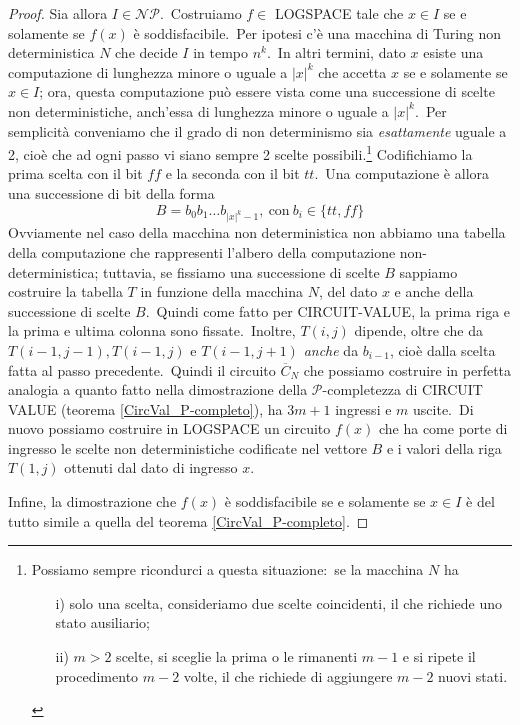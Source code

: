 \begin{proof}
    Sia allora $I \in \mathcal{NP}$.\
    Costruiamo $f \in$ LOGSPACE tale che $x \in I$ se e solamente se $f(x)$ è soddisfacibile.\
    Per ipotesi c'è una macchina di Turing non deterministica $N$ che decide $I$ in tempo $n^k$.\
    In altri termini, dato $x$ esiste una computazione di lunghezza minore o uguale a $|x|^k$ che accetta $x$ se e solamente se $x \in I$; ora, questa computazione può essere vista come una successione di scelte non deterministiche, anch'essa di lunghezza minore o uguale a $|x|^k$.\
    Per semplicità conveniamo che il grado di non determinismo sia \textit{esattamente} uguale a 2, cioè che ad ogni passo vi siano sempre 2 scelte possibili.\footnote{Possiamo sempre ricondurci a questa situazione:\ se la macchina $N$ ha
        \begin{itemize}
            \item[i)] solo una scelta, consideriamo due scelte coincidenti, il che richiede uno stato ausiliario;
            \item[ii)] $m > 2$ scelte, si sceglie la prima o le rimanenti $m-1$ e si ripete il procedimento $m-2$ volte, il che richiede di aggiungere $m-2$ nuovi stati.
        \end{itemize}}
    Codifichiamo la prima scelta con il bit $\mathit{ff}$ e la seconda con il bit $\mathit{tt}$.\
    Una computazione è allora una successione di bit della forma
    \[B = b_0 b_1 \dots b_{|x|^k-1},\ \mathrm{con}\ b_i \in \{\mathit{tt},\mathit{ff}\}\]
    Ovviamente nel caso della macchina non deterministica non abbiamo una tabella della computazione che rappresenti l'albero della computazione non-deterministica; tuttavia, se fissiamo una successione di scelte $B$ sappiamo costruire la tabella $T$ in funzione della macchina $N$, del dato $x$ e anche della successione di scelte $B$.\
    Quindi come fatto per {\footnotesize CIRCUIT-VALUE}, la prima riga e la prima e ultima colonna sono fissate.\
    Inoltre, $T(i,j)$ dipende, oltre che da $T(i-1,j-1), T(i-1,j)$ e $T(i-1,j+1)$ \textit{anche} da $b_{i-1}$, cioè dalla scelta fatta al passo precedente.\
    Quindi il circuito $\overline{C}_N$ che possiamo costruire in perfetta analogia a quanto fatto nella dimostrazione della $\mathcal{P}$-completezza di {\footnotesize CIRCUIT VALUE} (teorema \ref{CircVal_P-completo}), ha $3m + 1$ ingressi e $m$ uscite.\
    Di nuovo possiamo costruire in LOGSPACE un circuito $f(x)$ che ha come porte di ingresso le scelte non deterministiche codificate nel vettore $B$ e i valori della riga $T(1, j)$ ottenuti dal dato di ingresso $x$.\

    Infine, la dimostrazione che $f(x)$ è soddisfacibile se e solamente se $x \in I$ è del tutto simile a quella del teorema \ref{CircVal_P-completo}.

\end{proof}

